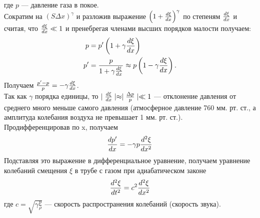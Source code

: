 где $p$ --- давление газа в покое.\\
Сократим на $(S \Delta x)^{\gamma}$ и разложив выражение $\left( 1 + \dv{\xi}{x}\right)^{\gamma}$ по степеням $\dv{\xi}{x}$ и считая, что $\dv{\xi}{x} \ll 1$ и пренебрегая членами высших порядков малости получаем:
\begin{align}
    p &= p^{\prime} \left( 1 + \gamma \dv{\xi}{x} \right) \\
    p^{\prime} &= \frac{p}{1 + \gamma \dv{\xi}{x}} \approx p \left( 1 - \gamma \dv{\xi}{x}\right).
\end{align}
Получаем $\frac{p^{\prime} - p}{p} = -\gamma \dv{\xi}{x}$.\\
Так как $\gamma$ порядка единицы, то $\mid \dv{\xi}{x} \mid \approx \mid 
\frac{\Delta p}{p} \mid \ll 1$ --- отклонение давления от среднего много меньше самого давления (атмосферное давление 760 мм. рт. ст., а амплитуда колебания воздуха не превышает 1 мм. рт. ст.).\\
Продифференцировав по x, получаем
\begin{equation}
    \dv{p^{\prime}}{x} = -\gamma p \dv[2]{\xi}{x}
\end{equation}
Подставляя это выражение в дифференциальное уравнение, получаем уравнение колебаний смещения $\xi$ в трубе с газом при адиабатическом законе
\begin{equation} \label{eq:volnovoe_uravnenie}
    \dv[2]{\xi}{t} = c^{2}\dv[2]{\xi}{x}
\end{equation}
где $c = \sqrt{\gamma \frac{p}{\rho}}$ --- скорость распространения колебаний (скорость звука).

